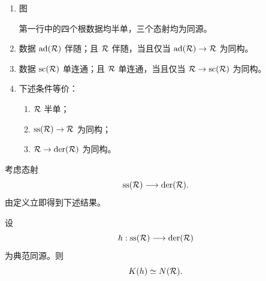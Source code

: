 \begin{proposition}\label{sga3:XXI:6.5.5}
\begin{enumerate}
\item[(i)] 图
\begin{center}
\end{center}
第一行中的四个根数据均半单，三个态射均为同源。
\item[(ii)] 数据 \(\operatorname{ad}(\mathcal{R})\) 伴随；且 \(\mathcal{R}\) 伴随，当且仅当 \(\operatorname{ad}(\mathcal{R})\to\mathcal{R}\) 为同构。
\item[(iii)] 数据 \(\operatorname{sc}(\mathcal{R})\) 单连通；且 \(\mathcal{R}\) 单连通，当且仅当 \(\mathcal{R}\to\operatorname{sc}(\mathcal{R})\) 为同构。
\item[(iv)] 下述条件等价：
\begin{enumerate}
\item[(a)] \(\mathcal{R}\) 半单；
\item[(b)] \(\operatorname{ss}(\mathcal{R})\to\mathcal{R}\) 为同构；
\item[(c)] \(\mathcal{R}\to\operatorname{der}(\mathcal{R})\) 为同构。
\end{enumerate}
\end{enumerate}
\end{proposition}

考虑态射
\[
 \operatorname{ss}(\mathcal{R})\longrightarrow\operatorname{der}(\mathcal{R}).
\]
由定义立即得到下述结果。

\begin{lemma}\label{sga3:XXI:6.5.6}
设
\[
 h:\operatorname{ss}(\mathcal{R})\longrightarrow\operatorname{der}(\mathcal{R})
\]
为典范同源。则
\[
 K(h)\simeq N(\mathcal{R}).
\]
\end{lemma}

